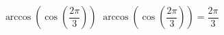  {$\arccos\left(\cos\left(\dfrac{2\pi}{3}\right) \right)$}
{ $\arccos\left(\cos\left(\dfrac{2\pi}{3}\right) \right) = \dfrac{2\pi}{3}$}
